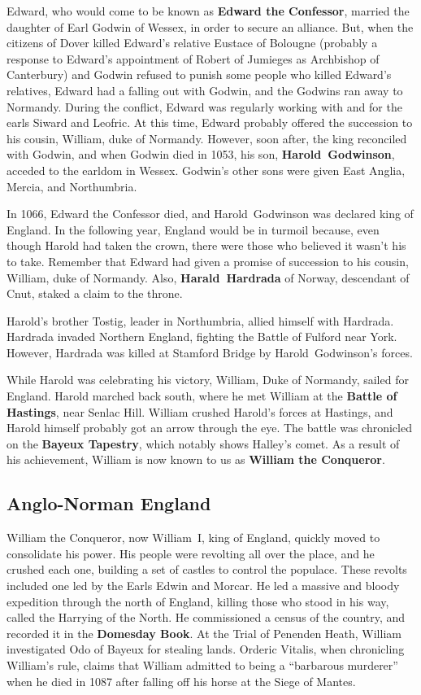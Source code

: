 Edward, who would come to be known as \textbf{Edward the Confessor},
married the daughter of Earl Godwin of Wessex, in order to secure an alliance.
But, when the citizens of Dover killed Edward's relative Eustace of Bolougne
(probably a response to Edward's appointment of Robert of Jumieges as Archbishop of Canterbury)
and Godwin refused to punish some people who killed Edward's relatives,
Edward had a falling out with Godwin, and the Godwins ran away to Normandy.
During the conflict, Edward was regularly working with and for the earls Siward and Leofric.
At this time, Edward probably offered the succession to his cousin, William, duke of Normandy.
However, soon after, the king reconciled with Godwin, and when Godwin died in 1053,
his son, \textbf{Harold~Godwinson}, acceded to the earldom in Wessex.
Godwin's other sons were given East Anglia, Mercia, and Northumbria.

In 1066, Edward the Confessor died, and Harold~Godwinson was declared king of England.
In the following year, England would be in turmoil because,
even though Harold had taken the crown, there were those who believed it wasn't his to take.
Remember that Edward had given a promise of succession to his cousin, William, duke of Normandy.
Also, \textbf{Harald~Hardrada} of Norway, descendant of Cnut, staked a claim to the throne.

Harold's brother Tostig, leader in Northumbria, allied himself with Hardrada.
Hardrada invaded Northern England, fighting the Battle of Fulford near York.
However, Hardrada was killed at Stamford Bridge by Harold~Godwinson's forces.

While Harold was celebrating his victory, William, Duke of Normandy, sailed for England.
Harold marched back south, where he met William at the \textbf{Battle of Hastings}, near Senlac Hill.
William crushed Harold's forces at Hastings, and Harold himself probably got an arrow through the eye.
The battle was chronicled on the \textbf{Bayeux Tapestry}, which notably shows Halley's comet.
As a result of his achievement, William is now known to us as \textbf{William the Conqueror}.

\subsection*{Anglo-Norman England}

William the Conqueror, now William~I, king of England, quickly moved to consolidate his power.
His people were revolting all over the place, and he crushed each one,
building a set of castles to control the populace.
These revolts included one led by the Earls Edwin and Morcar.
He led a massive and bloody expedition through the north of England,
killing those who stood in his way, called the Harrying of the North.
He commissioned a census of the country, and recorded it in the \textbf{Domesday Book}.
At the Trial of Penenden Heath, William investigated Odo of Bayeux for stealing lands.
Orderic Vitalis, when chronicling William's rule, claims that William admitted to being a ``barbarous murderer''
when he died in 1087 after falling off his horse at the Siege of Mantes.

